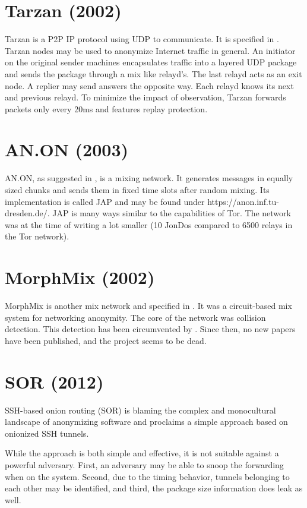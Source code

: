 \section{Tarzan (2002)}
Tarzan is a P2P IP protocol using UDP to communicate. It is specified in \cite{tarzan:ccs02}. Tarzan nodes may be used to anonymize Internet traffic in general. An initiator on the original sender machines encapsulates traffic into a layered UDP package and sends the package through a mix like relayd's. The last relayd acts as an exit node. A replier may send answers the opposite way. Each relayd knows its next and previous relayd. To minimize the impact of observation, Tarzan forwards packets only every 20ms and features replay protection.

\section{AN.ON (2003)}
AN.ON, as suggested in \cite{federrath2003system}, is a mixing network. It generates messages in equally sized chunks and sends them in fixed time slots after random mixing. Its implementation is called JAP and may be found under https://anon.inf.tu-dresden.de/. JAP is many ways similar to the capabilities of Tor. The network was at the time of writing a lot smaller (10 JonDos compared to 6500 relays in the Tor network).

\section{MorphMix (2002)}
MorphMix is another mix network and specified in \cite{morphmix:wpes2002}. It was a circuit-based mix system for networking anonymity. The core of the network was collision detection. This detection has been circumvented by \cite{morphmix:pet2006}. Since then, no new papers have been published, and the project seems to be dead.

\section{SOR (2012)}
SSH-based onion routing (SOR)\cite{Egners_2012} is blaming the complex and monocultural landscape of anonymizing software and proclaims a simple approach based on onionized SSH tunnels. 

While the approach is both simple and effective, it is not suitable against a powerful adversary. First, an adversary may be able{\tiny } to snoop the forwarding when on the system. Second, due to the timing behavior, tunnels belonging to each other may be identified, and third, the package size information does leak as well.


